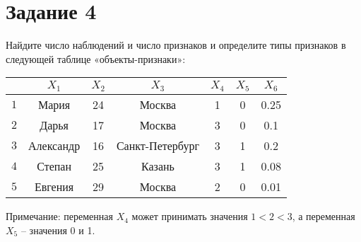 \documentclass[11pt, a4paper]{extarticle}
\begin{document}
	\section*{Задание 4}
	Найдите число наблюдений и число признаков и определите типы признаков в следующей таблице «объекты-признаки»:
	\begin{center}
		\def\arraystretch{1.5}
		\begin{tabular}{l| c c c c c c}
			\hline
			& $X_1$ & $X_2$ & $X_3$  & $X_4$ & $X_5$ & $X_6$ \\
			\hline
			$1$ & Мария & 24 & Москва & 1 & 0 & 0.25  \\
			$2$ & Дарья & 17 & Москва & 3 & 0 & 0.1  \\
			$3$ & Александр & 16 & Санкт-Петербург & 3 & 1 & 0.2  \\
			$4$ & Степан & 25 & Казань & 3 & 1 & 0.08  \\
			$5$ & Евгения & 29 & Москва & 2 & 0 & 0.01  \\
		\end{tabular}
	\end{center}
	{\small Примечание: переменная $X_4$ может принимать значения $1 < 2 < 3$, а переменная $X_5$ – значения 0 и 1.}
	
\end{document}
